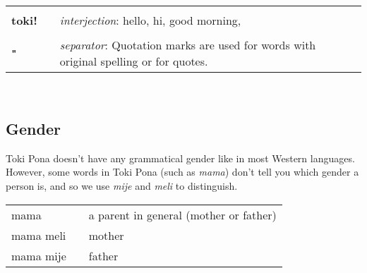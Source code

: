 \begin{supertabular}{p{2,5cm}|ll}
                             &  &                                                                                              \\ %
    \textbf{toki!}           &  & \textit{interjection}: hello, hi, good morning,                                              \\ %
                             &  &                                                                                              \\ %
    \textbf{"}               &  & \textit{separator}: Quotation marks are used for words with original spelling or for quotes. \\ %
\end{supertabular} \\
%
\subsection*{Gender}
%
Toki Pona doesn't have any grammatical gender like in most Western languages.
However, some words in Toki Pona (such as \textit{mama}) don't tell you which gender a person is, and so we use \textit{mije} and \textit{meli} to distinguish.

\begin{supertabular}{p{5,5cm}|ll}
    mama      &  & a parent in general (mother or father) \\
    mama meli &  & mother                                 \\
    mama mije &  & father                                 \\
\end{supertabular}

%
